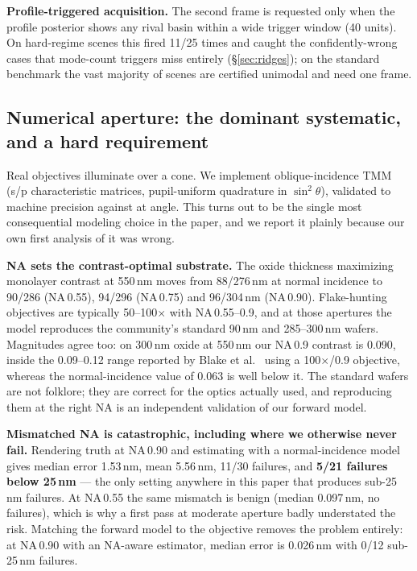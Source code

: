 \documentclass[10pt]{article}
\begin{document}
\textbf{Profile-triggered acquisition.} The second frame is requested only when the profile posterior shows any rival basin within a wide trigger window (40 units). On hard-regime scenes this fired 11/25 times and caught the confidently-wrong cases that mode-count triggers miss entirely (\S\ref{sec:ridges}); on the standard benchmark the vast majority of scenes are certified unimodal and need one frame.

\subsection{Numerical aperture: the dominant systematic, and a hard requirement}\label{sec:na}
Real objectives illuminate over a cone. We implement oblique-incidence TMM (s/p characteristic matrices, pupil-uniform quadrature in $\sin^2\theta$), validated to machine precision against \cite{byrnes2016} at angle. This turns out to be the single most consequential modeling choice in the paper, and we report it plainly because our own first analysis of it was wrong.

\textbf{NA sets the contrast-optimal substrate.} The oxide thickness maximizing monolayer contrast at 550\,nm moves from 88/276\,nm at normal incidence to 90/286 (NA\,0.55), 94/296 (NA\,0.75) and 96/304\,nm (NA\,0.90). Flake-hunting objectives are typically 50--100$\times$ with NA\,0.55--0.9, and at those apertures the model reproduces the community's standard 90\,nm and 285--300\,nm wafers. Magnitudes agree too: on 300\,nm oxide at 550\,nm our NA\,0.9 contrast is 0.090, inside the 0.09--0.12 range reported by Blake et al.\ \cite{blake2007} using a 100$\times$/0.9 objective, whereas the normal-incidence value of 0.063 is well below it. The standard wafers are not folklore; they are correct for the optics actually used, and reproducing them at the right NA is an independent validation of our forward model.

\textbf{Mismatched NA is catastrophic, including where we otherwise never fail.} Rendering truth at NA\,0.90 and estimating with a normal-incidence model gives median error 1.53\,nm, mean 5.56\,nm, 11/30 failures, and \textbf{5/21 failures below 25\,nm} --- the only setting anywhere in this paper that produces sub-25\,nm failures. At NA\,0.55 the same mismatch is benign (median 0.097\,nm, no failures), which is why a first pass at moderate aperture badly understated the risk. Matching the forward model to the objective removes the problem entirely: at NA\,0.90 with an NA-aware estimator, median error is 0.026\,nm with 0/12 sub-25\,nm failures.
\end{document}
